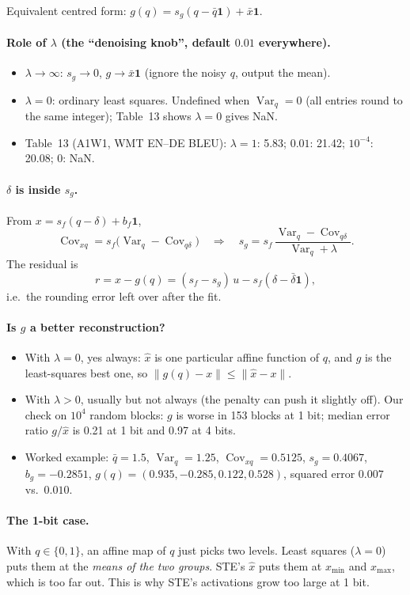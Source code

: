 \documentclass[11pt]{article}
\newcommand{\one}{\mathbf 1}
\newcommand{\Var}{\operatorname{Var}}
\newcommand{\Cov}{\operatorname{Cov}}
\begin{document}
Equivalent centred form: $g(q)=s_g(q-\bar q\one)+\bar x\one$.

\paragraph{Role of $\lambda$ (the ``denoising knob'', default $0.01$ everywhere).}
\begin{itemize}
\item $\lambda\to\infty$: $s_g\to0$, $g\to\bar x\one$ (ignore the noisy $q$, output the mean).
\item $\lambda=0$: ordinary least squares. Undefined when $\Var_q=0$ (all entries round to the same integer); Table~13 shows $\lambda=0$ gives NaN.
\item Table~13 (A1W1, WMT EN--DE BLEU): $\lambda=1$: 5.83; $0.01$: 21.42; $10^{-4}$: 20.08; $0$: NaN.
\end{itemize}

\paragraph{$\delta$ is inside $s_g$.} From $x=s_f(q-\delta)+b_f\one$,
\[
\Cov_{xq}=s_f\big(\Var_q-\Cov_{q\delta}\big)\quad\Longrightarrow\quad
s_g=s_f\,\frac{\Var_q-\Cov_{q\delta}}{\Var_q+\lambda}.
\]
The residual is
\[
r=x-g(q)=(s_f-s_g)\,u-s_f(\delta-\bar\delta\one),
\]
i.e.\ the rounding error left over after the fit.

\paragraph{Is $g$ a better reconstruction?}
\begin{itemize}
\item With $\lambda=0$, yes always: $\hat x$ is one particular affine function of $q$, and $g$ is the least-squares best one, so $\|g(q)-x\|\le\|\hat x-x\|$.
\item With $\lambda>0$, usually but not always (the penalty can push it slightly off). Our check on $10^4$ random blocks: $g$ is worse in 153 blocks at 1 bit; median error ratio $g/\hat x$ is 0.21 at 1 bit and 0.97 at 4 bits.
\item Worked example: $\bar q=1.5$, $\Var_q=1.25$, $\Cov_{xq}=0.5125$, $s_g=0.4067$, $b_g=-0.2851$, $g(q)=(0.935,-0.285,0.122,0.528)$, squared error $0.007$ vs.\ $0.010$.
\end{itemize}

\paragraph{The 1-bit case.} With $q\in\{0,1\}$, an affine map of $q$ just picks two levels. Least squares ($\lambda=0$) puts them at the \emph{means of the two groups}. STE's $\hat x$ puts them at $x_{\min}$ and $x_{\max}$, which is too far out. This is why STE's activations grow too large at 1 bit.
\end{document}
